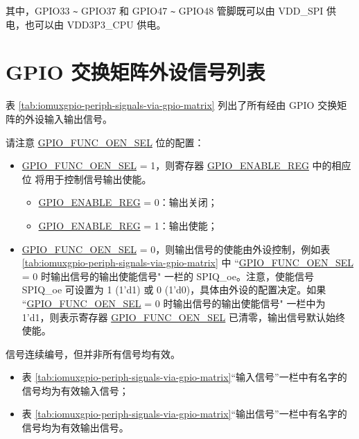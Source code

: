 \documentclass[main\_\_CN.tex]{subfiles}
\begin{document}
其中，GPIO33 \verb+~+ GPIO37 和 GPIO47 \verb+~+ GPIO48 管脚既可以由 VDD\_SPI 供电，也可以由 VDD3P3\_CPU 供电。

\section{GPIO 交换矩阵外设信号列表}
\label{sec:peripheral_signals}

表 \ref{tab:iomuxgpio-periph-signals-via-gpio-matrix} 列出了所有经由 GPIO 交换矩阵的外设输入输出信号。

请注意 \hyperref[fielddesc:GPIOFUNCNOENSEL]{GPIO\_FUNC\_OEN\_SEL} 位的配置：

\begin{itemize}
    \item \hyperref[fielddesc:GPIOFUNCNOENSEL]{GPIO\_FUNC\_OEN\_SEL} = 1，则寄存器 \hyperref[regdesc:GPIOENABLEREG]{GPIO\_ENABLE\_REG} 中的相应位   将用于控制信号输出使能。
    \begin{itemize}
        \item \hyperref[regdesc:GPIOENABLEREG]{GPIO\_ENABLE\_REG} = 0：输出关闭；
        \item \hyperref[regdesc:GPIOENABLEREG]{GPIO\_ENABLE\_REG} = 1：输出使能；
    \end{itemize}
    \item \hyperref[fielddesc:GPIOFUNCNOENSEL]{GPIO\_FUNC\_OEN\_SEL} = 0，则输出信号的使能由外设控制，例如表 \ref{tab:iomuxgpio-periph-signals-via-gpio-matrix} 中 ``\hyperref[fielddesc:GPIOFUNCNOENSEL]{GPIO\_FUNC\_OEN\_SEL} = 0 时输出信号的输出使能信号" 一栏的 SPIQ\_oe。注意，使能信号 SPIQ\_oe 可设置为 1 (1'd1) 或 0 (1'd0)，具体由外设的配置决定。如果 ``\hyperref[fielddesc:GPIOFUNCNOENSEL]{GPIO\_FUNC\_OEN\_SEL} = 0 时输出信号的输出使能信号" 一栏中为 1'd1，则表示寄存器 \hyperref[fielddesc:GPIOFUNCNOENSEL]{GPIO\_FUNC\_OEN\_SEL} 已清零，输出信号默认始终使能。
\end{itemize}

\begin{tiplisting}
信号连续编号，但并非所有信号均有效。
\vspace{-1em}
\begin{itemize}
    \item 表 \ref{tab:iomuxgpio-periph-signals-via-gpio-matrix}“输入信号”一栏中有名字的信号均为有效输入信号；
    \item 表 \ref{tab:iomuxgpio-periph-signals-via-gpio-matrix}“输出信号”一栏中有名字的信号均为有效输出信号。
\end{itemize}
\end{tiplisting}
\end{document}
